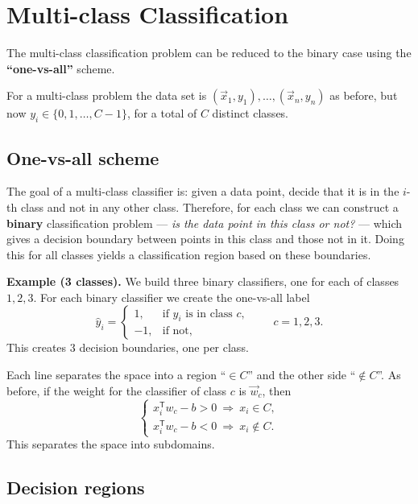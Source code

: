\documentclass[
  letterpaper,
  DIV=11,
  numbers=noendperiod]{scrreprt}
\theoremstyle{definition}
\theoremstyle{plain}
\theoremstyle{plain}
\theoremstyle{definition}
\theoremstyle{plain}
\theoremstyle{plain}
\theoremstyle{remark}
\begin{document}
\section{Multi-class Classification}\label{multi-class-classification}

The multi-class classification problem can be reduced to the binary case
using the \textbf{``one-vs-all''} scheme.

For a multi-class problem the data set is
\((\vec{x}_1, y_1), \dots, (\vec{x}_n, y_n)\) as before, but now
\(y_i \in \{0, 1, \dots, C-1\}\), for a total of \(C\) distinct classes.

\subsection{One-vs-all scheme}\label{one-vs-all-scheme}

The goal of a multi-class classifier is: given a data point, decide that
it is in the \(i\)-th class and not in any other class. Therefore, for
each class we can construct a \textbf{binary} classification problem ---
\emph{is the data point in this class or not?} --- which gives a
decision boundary between points in this class and those not in it.
Doing this for all classes yields a classification region based on these
boundaries.

\textbf{Example (3 classes).} We build three binary classifiers, one for
each of classes \(1, 2, 3\). For each binary classifier we create the
one-vs-all label \[
\hat{y}_i =
\begin{cases}
1, & \text{if } y_i \text{ is in class } c, \\
-1, & \text{if not},
\end{cases}
\qquad c = 1, 2, 3 .
\] This creates \(3\) decision boundaries, one per class.

Each line separates the space into a region ``\(\in C\)'' and the other
side ``\(\notin C\)''. As before, if the weight for the classifier of
class \(c\) is \(\vec{w}_c\), then \[
\begin{cases}
x_i^{\mathsf T} w_c - b > 0 \ \Rightarrow\ x_i \in C, \\
x_i^{\mathsf T} w_c - b < 0 \ \Rightarrow\ x_i \notin C .
\end{cases}
\] This separates the space into subdomains.

\subsection{Decision regions}\label{decision-regions}
\end{document}

